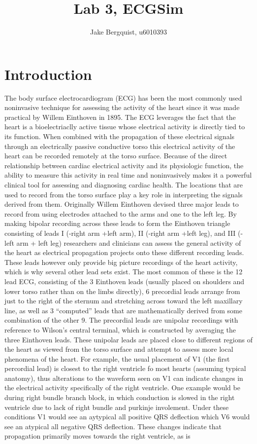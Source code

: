 \documentclass[12pt]{article}
\begin{document}
\title{Lab 3, ECGSim}
\author{Jake Bergquist, u6010393}
\maketitle


\section{Introduction}
The body surface electrocardiogram (ECG) has been the most commonly used noninvasive technique for assessing the activity of the heart since it was made practical by Willem Einthoven in 1895. The ECG leverages the fact that the heart is a bioelectriaclly active tissue whose electrical activity is directly tied to its function. When combined with the propagation of these electrical signals through an electrically passive conductive torso this electrical activity of the heart can be recorded remotely at the torso surface. Because of the direct relationship between cardiac electrical activity and its physiologic function, the ability to measure this activity in real time and noninvasively makes it a powerful clinical tool for assessing and diagnosing cardiac health. The locations that are used to record from the torso surface play a key role in interpreting the signals derived from them. Originally Willem Einthoven devised three major leads to record from using electrodes attached to the arms and one to the left leg. By making bipolar recording across these leads to form the Einthoven triangle consisting of leads I (-right arm +left arm), II (-right arm +left leg), and III (-left arm + left leg) researchers and clinicians can assess the general activity of the heart as electrical propagation projects onto these different recording leads. These leads however only provide big picture recordings of the heart activity, which is why several other lead sets exist. The most common of these is the 12 lead ECG, consisting of the 3 Einthoven leads (usually placed on shoulders and lower torso rather than on the limbs directly), 6 precordial leads arrange from just to the right of the sternum and stretching across toward the left maxillary line, as well as 3 ``computed'' leads that are mathematically derived from some combination of the other 9. The precordial leads are unipolar recordings with reference to Wilson's central terminal, which is constructed by averaging the three Einthoven leads. These unipolar leads are placed close to different regions of the heart as viewed from the torso surface and attempt to assess more local phenomena of the heart. For example, the usual placement of V1 (the first percordial lead) is closest to the right ventricle fo most hearts (assuming typical anatomy), thus alterations to the waveform seen on V1 can indicate changes in the electrical activity specifically of the right ventricle. One example would be during right bundle branch block, in which conduction is slowed in the right ventricle due to lack of right bundle and purkinje involement. Under these conditions V1 would see an aytypical all positive QRS deflection which V6 would see an atypical all negative QRS deflection. These changes indicate that propagation primarily moves towards the right ventricle, as is 
\end{document}
